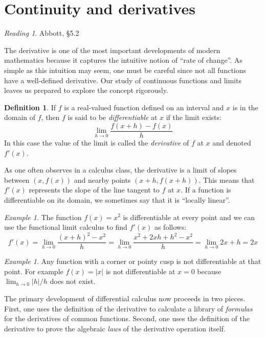 \documentclass[11pt,oneside]{amsbook}
\theoremstyle{definition}
\theoremstyle{plain}
\theoremstyle{definition}
\newtheorem{definition}[theorem]{Definition}
\theoremstyle{remark}
\newtheorem{example}[theorem]{Example}
\newtheorem*{reading}{Reading}
\numberwithin{equation}{section}
\numberwithin{figure}{section}
\begin{document}


\newpage
\section{Continuity and derivatives}

\begin{reading}
  Abbott, \S 5.2
\end{reading}

The derivative is one of the most important developments of modern mathematics because it captures the intuitive notion of ``rate of change''. As simple as this intuition may seem, one must be careful since not all functions have a well-defined derivative. Our study of continuous functions and limits leaves us prepared to explore the concept rigorously.

\begin{definition}
If $f$ is a real-valued function defined on an interval and $x$ is in the domain of $f$, then $f$ is said to be \emph{differentiable} at $x$ if the limit exists:
\[\lim_{h\to0}\frac{f(x+h)-f(x)}{h}
\]
In this case the value of the limit is called the \emph{derivative} of $f$ at $x$ and denoted $f'(x)$.
\end{definition}

As one often observes in a calculus class, the derivative is a limit of slopes between $(x,f(x))$ and nearby points $(x+h,f(x+h))$. This means that $f'(x)$ represents the slope of the line tangent to $f$ at $x$. If a function is differentiable on its domain, we sometimes say that it is ``locally linear''.

\begin{example}
  The function $f(x)=x^2$ is differentiable at every point and we can use the functional limit calculus to find $f'(x)$ as follows:
  \[f'(x)=\lim_{h\to0}\frac{(x+h)^2-x^2}{h}
  =\lim_{h\to0}\frac{x^2+2xh+h^2-x^2}{h}=\lim_{h\to0}2x+h=2x
  \]
\end{example}

\begin{example}
  Any function with a corner or pointy cusp is not differentiable at that point. For example $f(x)=|x|$ is not differentiable at $x=0$ because $\lim_{h\to0}|h|/h$ does not exist.
\end{example}

The primary development of differential calculus now proceeds in two pieces. First, one uses the definition of the derivative to calculate a library of \emph{formulas} for the derivatives of common functions. Second, one uses the definition of the derivative to prove the algebraic \emph{laws} of the derivative operation itself.
\end{document}
